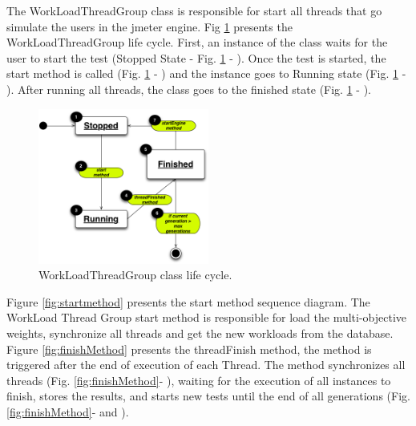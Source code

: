 \documentclass[espaco=umemeio,chapter=TITLE,twoside,openright]{abnt}
\begin{document}
The WorkLoadThreadGroup class is responsible for start all threads that go simulate the users in the jmeter engine. Fig \ref{fig:statesworkload} presents the WorkLoadThreadGroup life cycle. First, an instance of the class waits for the user to start the test (Stopped State - Fig. \ref{fig:statesworkload} - ). Once the test is started, the start method is called (Fig. \ref{fig:statesworkload} - ) and the instance goes to Running state (Fig. \ref{fig:statesworkload} - ). After running all threads, the class goes to the finished state  (Fig. \ref{fig:statesworkload} - ).


\begin{figure}[h]
\centering
\includegraphics[width=0.5\textwidth]{./images/statesworkload.png}
\caption{WorkLoadThreadGroup class life cycle.}
\label{fig:statesworkload}
\end{figure}



Figure \ref{fig:startmethod} presents the start method sequence diagram. The WorkLoad Thread Group start method is responsible for load the multi-objective weights, synchronize all threads and get the new workloads from the database. Figure \ref{fig:finishMethod} presents the threadFinish method, the method is triggered after the end of execution of each Thread. The method synchronizes all threads (Fig. \ref{fig:finishMethod}- ), waiting for the execution of all instances to finish, stores the results, and starts new tests until the end of all generations (Fig. \ref{fig:finishMethod}- and  ).
\end{document}
